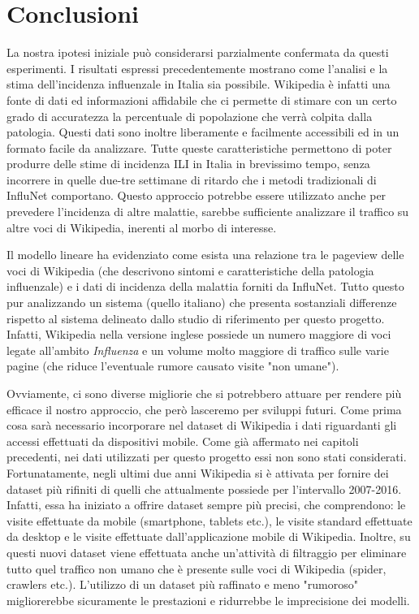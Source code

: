 \section{Conclusioni}
\bigskip

La nostra ipotesi iniziale può considerarsi parzialmente confermata da questi esperimenti. 
I risultati espressi precedentemente mostrano come l'analisi e la stima dell'incidenza influenzale in Italia sia possibile. 
Wikipedia è infatti una fonte di dati ed informazioni affidabile che ci permette di stimare con un certo grado di 
accuratezza la percentuale di popolazione che verrà colpita dalla patologia. Questi dati sono inoltre liberamente e 
facilmente accessibili ed in un formato facile da analizzare. Tutte queste caratteristiche permettono di poter produrre delle 
stime di incidenza ILI in Italia in brevissimo tempo, senza incorrere in quelle due-tre settimane di ritardo che i metodi 
tradizionali di InfluNet comportano. Questo approccio potrebbe essere utilizzato anche per prevedere l'incidenza di altre malattie, sarebbe sufficiente analizzare il traffico su altre voci di Wikipedia, inerenti al morbo di interesse.
\bigskip

Il modello lineare ha evidenziato come esista una relazione tra le pageview delle voci di Wikipedia (che descrivono sintomi e 
caratteristiche della patologia influenzale) e i dati di incidenza della malattia forniti da InfluNet. Tutto questo pur 
analizzando un sistema (quello italiano) che presenta sostanziali differenze rispetto al sistema delineato dallo studio di 
riferimento per questo progetto. Infatti, Wikipedia nella versione inglese possiede un numero maggiore di voci legate 
all'ambito \textit{Influenza} e un volume molto maggiore di traffico sulle varie pagine (che riduce l'eventuale rumore 
causato visite "non umane").   
\bigskip

Ovviamente, ci sono diverse migliorie che si potrebbero attuare per rendere più efficace il nostro approccio, che però 
lasceremo per sviluppi futuri. Come prima cosa sarà necessario incorporare nel dataset di Wikipedia i dati riguardanti gli 
accessi effettuati da dispositivi mobile. Come già affermato nei capitoli precedenti, nei dati utilizzati per questo progetto 
essi non sono stati considerati. Fortunatamente, negli ultimi due anni Wikipedia si è attivata per fornire dei dataset più 
rifiniti di quelli che attualmente possiede per l'intervallo 2007-2016. Infatti, essa ha iniziato a offrire dataset sempre più 
precisi, che comprendono: le visite effettuate da mobile (smartphone, tablets etc.), le visite standard effettuate da desktop 
e le visite effettuate dall'applicazione mobile di Wikipedia. Inoltre, su questi nuovi dataset viene effettuata anche 
un'attività di filtraggio per eliminare tutto quel traffico non umano che è presente sulle voci di Wikipedia (spider, 
crawlers etc.). L'utilizzo di un dataset più raffinato e meno "rumoroso" migliorerebbe sicuramente le prestazioni e 
ridurrebbe le imprecisione dei modelli. 
\bigskip

